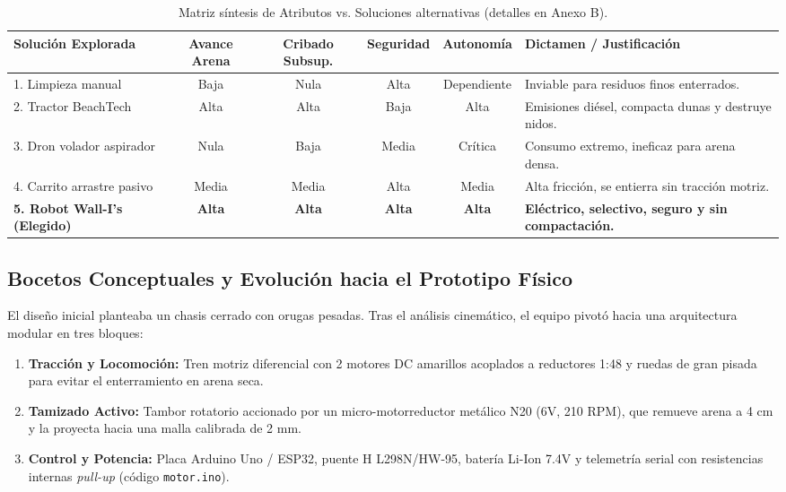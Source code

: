 \documentclass[12pt,letterpaper]{article}
\begin{document}
\begin{table}[h!]
\centering
\small
{}
\begin{tabularx}{\textwidth}{p{3.6cm} c c c c X}
\toprule
\textbf{Solución Explorada} & \textbf{Avance Arena} & \textbf{Cribado Subsup.} & \textbf{Seguridad} & \textbf{Autonomía} & \textbf{Dictamen / Justificación} \\
\midrule
1. Limpieza manual & Baja & Nula & Alta & Dependiente & Inviable para residuos finos enterrados. \\
2. Tractor BeachTech & Alta & Alta & Baja & Alta & Emisiones diésel, compacta dunas y destruye nidos. \\
3. Dron volador aspirador & Nula & Baja & Media & Crítica & Consumo extremo, ineficaz para arena densa. \\
4. Carrito arrastre pasivo & Media & Media & Alta & Media & Alta fricción, se entierra sin tracción motriz. \\
\textbf{5. Robot Wall-I's (Elegido)} & \textbf{Alta} & \textbf{Alta} & \textbf{Alta} & \textbf{Alta} & \textbf{Eléctrico, selectivo, seguro y sin compactación.} \\
\bottomrule
\end{tabularx}
\caption{Matriz síntesis de Atributos vs. Soluciones alternativas (detalles en Anexo B).}
\end{table}

\subsection{Bocetos Conceptuales y Evolución hacia el Prototipo Físico}
El diseño inicial planteaba un chasis cerrado con orugas pesadas. Tras el análisis cinemático, el equipo pivotó hacia una arquitectura modular en tres bloques:
\begin{enumerate}[leftmargin=*, noitemsep]
    \item \textbf{Tracción y Locomoción:} Tren motriz diferencial con 2 motores DC amarillos acoplados a reductores 1:48 y ruedas de gran pisada para evitar el enterramiento en arena seca.
    \item \textbf{Tamizado Activo:} Tambor rotatorio accionado por un micro-motorreductor metálico N20 (6V, 210 RPM), que remueve arena a 4 cm y la proyecta hacia una malla calibrada de 2 mm.
    \item \textbf{Control y Potencia:} Placa Arduino Uno / ESP32, puente H L298N/HW-95, batería Li-Ion 7.4V y telemetría serial con resistencias internas \textit{pull-up} (código \texttt{motor.ino}).
\end{enumerate}
\end{document}
